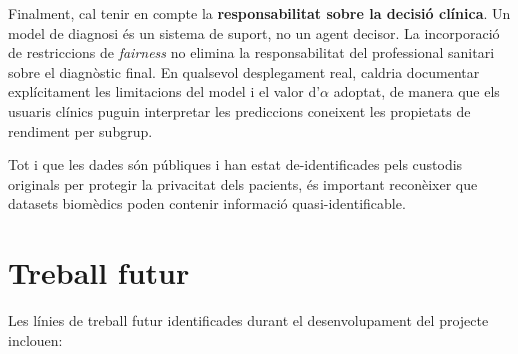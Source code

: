 \documentclass[a4paper,12pt,twoside]{ThesisStyle}
\begin{document}
Finalment, cal tenir en compte la \textbf{responsabilitat sobre la decisió clínica}. Un model de diagnosi és un sistema de suport, no un agent decisor. La incorporació de restriccions de \textit{fairness} no elimina la responsabilitat del professional sanitari sobre el diagnòstic final. En qualsevol desplegament real, caldria documentar explícitament les limitacions del model i el valor d'$\alpha$ adoptat, de manera que els usuaris clínics puguin interpretar les prediccions coneixent les propietats de rendiment per subgrup.

Tot i que les dades són públiques i han estat de-identificades pels custodis originals per protegir la privacitat dels pacients, és important reconèixer que datasets biomèdics poden contenir informació quasi-identificable.

\section{Treball futur}

Les línies de treball futur identificades durant el desenvolupament del projecte inclouen:
\end{document}
